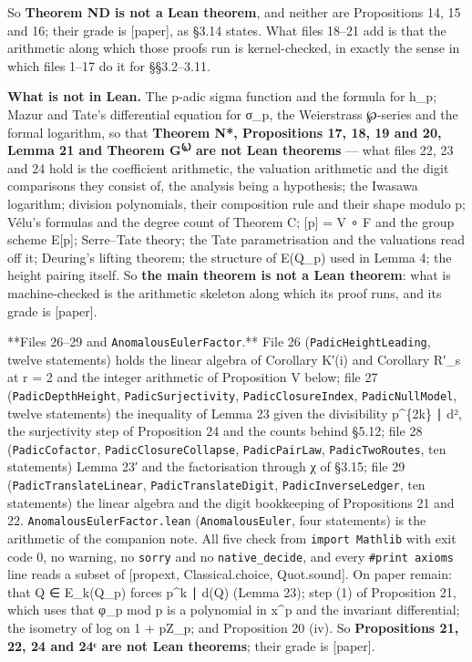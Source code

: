 \documentclass[11pt,a4paper]{article}
\theoremstyle{named}
\begin{document}
So \textbf{Theorem ND is not a Lean theorem}, and neither are Propositions 14, 15 and 16; their grade is [paper], as §3.14 states. What files 18–21 add is that the arithmetic along which those proofs run is kernel-checked, in exactly the sense in which files 1–17 do it for §§3.2–3.11.

\textbf{What is not in Lean.} The p-adic sigma function and the formula for h\_p; Mazur and Tate's differential equation for σ\_p, the Weierstrass ℘-series and the formal logarithm, so that \textbf{Theorem N*, Propositions 17, 18, 19 and 20, Lemma 21 and Theorem G⁽ᵏ⁾ are not Lean theorems} — what files 22, 23 and 24 hold is the coefficient arithmetic, the valuation arithmetic and the digit comparisons they consist of, the analysis being a hypothesis; the Iwasawa logarithm; division polynomials, their composition rule and their shape modulo p; Vélu's formulas and the degree count of Theorem C; [p] = V ∘ F and the group scheme E[p]; Serre–Tate theory; the Tate parametrisation and the valuations read off it; Deuring's lifting theorem; the structure of E(Q\_p) used in Lemma 4; the height pairing itself. So \textbf{the main theorem is not a Lean theorem}: what is machine-checked is the arithmetic skeleton along which its proof runs, and its grade is [paper].

**Files 26–29 and \texttt{AnomalousEulerFactor}.** File 26 (\texttt{PadicHeightLeading}, twelve statements) holds the linear algebra of Corollary K′(i) and Corollary R′\_s at r = 2 and the integer arithmetic of Proposition V below; file 27 (\texttt{PadicDepthHeight}, \texttt{PadicSurjectivity}, \texttt{PadicClosureIndex}, \texttt{PadicNullModel}, twelve statements) the inequality of Lemma 23 given the divisibility p\textasciicircum{}\{2k\} ∣ d², the surjectivity step of Proposition 24 and the counts behind §5.12; file 28 (\texttt{PadicCofactor}, \texttt{PadicClosureCollapse}, \texttt{PadicPairLaw}, \texttt{PadicTwoRoutes}, ten statements) Lemma 23′ and the factorisation through χ of §3.15; file 29 (\texttt{PadicTranslateLinear}, \texttt{PadicTranslateDigit}, \texttt{PadicInverseLedger}, ten statements) the linear algebra and the digit bookkeeping of Propositions 21 and 22. \texttt{AnomalousEulerFactor.\allowbreak{}lean} (\texttt{AnomalousEuler}, four statements) is the arithmetic of the companion note. All five check from \texttt{import\ \allowbreak{}Mathlib} with exit code 0, no warning, no \texttt{sorry} and no \texttt{native\_\allowbreak{}decide}, and every \texttt{\#print\ \allowbreak{}axioms} line reads a subset of [propext, Classical.choice, Quot.sound]. On paper remain: that Q ∈ E\_k(Q\_p) forces p\textasciicircum{}k ∣ d(Q) (Lemma 23); step (1) of Proposition 21, which uses that φ\_p mod p is a polynomial in x\textasciicircum{}p and the invariant differential; the isometry of log on 1 + pZ\_p; and Proposition 20 (iv). So \textbf{Propositions 21, 22, 24 and 24ᶜ are not Lean theorems}; their grade is [paper].
\end{document}
